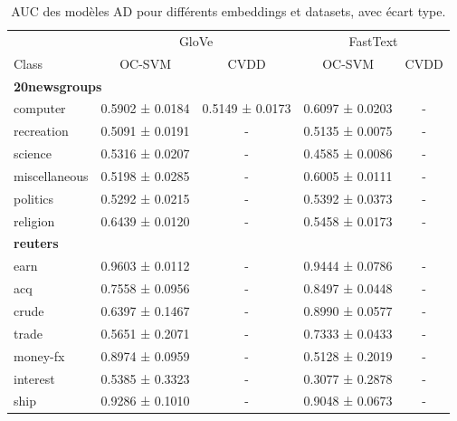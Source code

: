 \begin{table}[ht]
\centering
\begin{tabular}{l|cc|cc}
\hline
 & \multicolumn{2}{c|}{GloVe} & \multicolumn{2}{c}{FastText} \\
Class & OC-SVM & CVDD & OC-SVM & CVDD \\
\hline
\multicolumn{5}{l}{\textbf{20newsgroups}} \\
computer & 0.5902 ± 0.0184 & 0.5149 ± 0.0173 & 0.6097 ± 0.0203 & - \\
recreation & 0.5091 ± 0.0191 & - & 0.5135 ± 0.0075 & - \\
science & 0.5316 ± 0.0207 & - & 0.4585 ± 0.0086 & - \\
miscellaneous & 0.5198 ± 0.0285 & - & 0.6005 ± 0.0111 & - \\
politics & 0.5292 ± 0.0215 & - & 0.5392 ± 0.0373 & - \\
religion & 0.6439 ± 0.0120 & - & 0.5458 ± 0.0173 & - \\
\multicolumn{5}{l}{\textbf{reuters}} \\
earn & 0.9603 ± 0.0112 & - & 0.9444 ± 0.0786 & - \\
acq & 0.7558 ± 0.0956 & - & 0.8497 ± 0.0448 & - \\
crude & 0.6397 ± 0.1467 & - & 0.8990 ± 0.0577 & - \\
trade & 0.5651 ± 0.2071 & - & 0.7333 ± 0.0433 & - \\
money-fx & 0.8974 ± 0.0959 & - & 0.5128 ± 0.2019 & - \\
interest & 0.5385 ± 0.3323 & - & 0.3077 ± 0.2878 & - \\
ship & 0.9286 ± 0.1010 & - & 0.9048 ± 0.0673 & - \\
\hline
\end{tabular}
\caption{AUC des modèles AD pour différents embeddings et datasets, avec écart type.}
\label{tab:ad_results}
\end{table}
